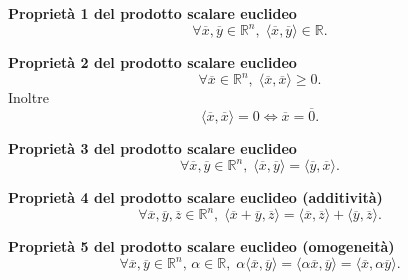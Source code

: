 \begin{property}\label{p:pro-sca-1}
    \textbf{Proprietà 1 del prodotto scalare euclideo}
    \[ \forall\overline{x},\overline{y}\in\mathbb{R}^n,\;
    \langle\overline{x},\overline{y}\rangle \in\mathbb{R}. \]
\end{property}

\begin{property}\label{p:pro-sca-2}
    \textbf{Proprietà 2 del prodotto scalare euclideo}
    \[ \forall\overline{x}\in\mathbb{R}^n,\;
    \langle\overline{x},\overline{x}\rangle \geq 0. \]
    Inoltre
    \[ \langle\overline{x},\overline{x}\rangle = 0 \Leftrightarrow \overline{x}=\overline{0}. \]
\end{property}

\begin{property}\label{p:pro-sca-3}
    \textbf{Proprietà 3 del prodotto scalare euclideo}
    \[ \forall\overline{x},\overline{y}\in\mathbb{R}^n,\;
    \langle\overline{x},\overline{y}\rangle=\langle\overline{y},\overline{x}\rangle. \]
\end{property}

\begin{property}\label{p:pro-sca-4}
    \textbf{Proprietà 4 del prodotto scalare euclideo (additività)}
    \[ \forall\overline{x},\overline{y},\overline{z}\in\mathbb{R}^n,\;
    \langle\overline{x}+\overline{y},\overline{z}\rangle=\langle\overline{x},\overline{z}\rangle + \langle\overline{y},\overline{z}\rangle. \]
\end{property}

\begin{property}\label{p:pro-sca-5}
    \textbf{Proprietà 5 del prodotto scalare euclideo (omogeneità)}
    \[ \forall\overline{x},\overline{y}\in\mathbb{R}^n,\, \alpha\in\mathbb{R},\;
    \alpha\langle\overline{x},\overline{y}\rangle = \langle\alpha\overline{x},\overline{y}\rangle = \langle\overline{x},\alpha\overline{y}\rangle. \]
\end{property}
